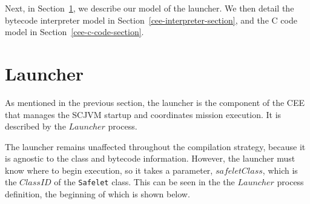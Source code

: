 

%

%

Next, in Section~\ref{cee-launcher-section}, we describe our model of
the launcher.
We then detail the bytecode interpreter model in
Section~\ref{cee-interpreter-section}, and the C code model in
Section~\ref{cee-c-code-section}.

\section{Launcher}
\label{cee-launcher-section}

As mentioned in the previous section, the launcher is the component of
the CEE that manages the SCJVM startup and coordinates mission
execution.
It is described by the $Launcher$ process.

The launcher remains unaffected throughout the compilation strategy,
because it is agnostic to the class and bytecode information.
However, the launcher must know where to begin execution, so it takes
a parameter, $safeletClass$, which is the $ClassID$ of the
\texttt{Safelet} class.
This can be seen in the the $Launcher$ process definition, the
beginning of which is shown below.

